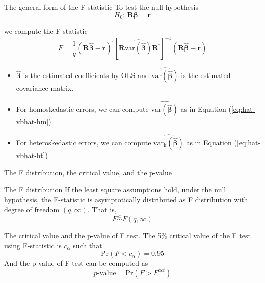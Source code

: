 \documentclass[presentation,10pt]{beamer}
\newcommand{\var}{\mathrm{var}}
\newcommand{\pr}{\mathrm{Pr}}
\begin{document}
\begin{frame}[label={sec:orgb0da466}]{The general form of the F-statistic}
To test the null hypothesis
\[ H_0:\, \mathbf{R}\boldsymbol{\beta} = \mathbf{r} \]

we compute the F-statistic
\begin{equation}
\label{eq:ftest-gen}
F = \frac{1}{q}(\mathbf{R}\hat{\boldsymbol{\beta}} - \mathbf{r})^{\prime} \left[ \mathbf{R} \widehat{\var(\hat{\boldsymbol{\beta}})} \mathbf{R}^{\prime} \right]^{-1} (\mathbf{R}\hat{\boldsymbol{\beta}} - \mathbf{r})
\end{equation}

\begin{itemize}
\item \(\hat{\boldsymbol{\beta}}\) is the estimated coefficients by OLS and
\(\widehat{\var(\hat{\boldsymbol{\beta}})}\) is the estimated covariance
matrix.
\item For homoskedastic errors, we can compute
\(\widehat{\var(\hat{\boldsymbol{\beta}})}\) as in Equation (\ref{eq:hat-vbhat-hm})
\item For heteroskedastic errors, we can compute
\(\widehat{\var_{\mathrm{h}}(\hat{\boldsymbol{\beta}})}\) as in
Equation (\ref{eq:hat-vbhat-ht})
\end{itemize}
\end{frame}

\begin{frame}[label={sec:org63d1010}]{The F distribution, the critical value, and the p-value}
\begin{block}{The F distribution}
If the least square assumptions hold, under the null hypothesis, the
F-statistic is asymptotically distributed as F distribution with
degree of freedom \((q, \infty)\). That is,
\[ F \overset{a}{\sim} F(q, \infty) \]
\end{block}

\begin{block}{The critical value and the p-value of F test.}
The 5\% critical value of the F test using F-statistic is \(c_{\alpha}\)
such that
\[\pr(F < c_{\alpha}) = 0.95\]
And the p-value of F test can be computed as
 \[ p\text{-value} = \pr(F > F^{act})\]
\end{block}
\end{frame}
\end{document}
